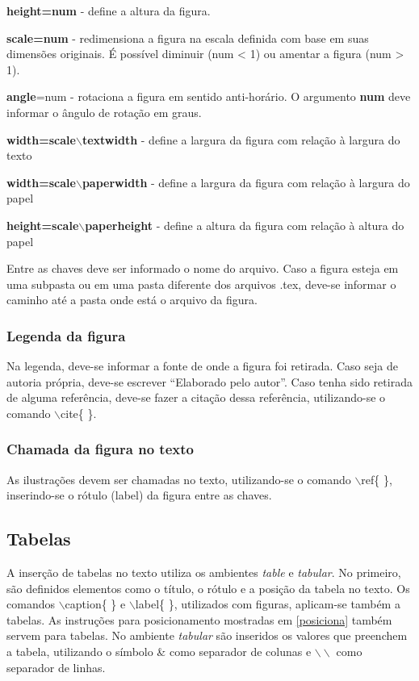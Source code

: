 \textbf{height=num} - define a altura da figura.

\textbf{scale=num} - redimensiona a figura na escala definida com base em suas dimensões originais. É possível diminuir (num < 1) ou amentar a figura (num > 1).

\textbf{angle}=num - rotaciona a figura em sentido anti-horário. O argumento \textbf{num} deve informar o ângulo de rotação em graus.

\textbf{width=scale$\backslash$textwidth} - define a largura da figura com relação à largura do texto

\textbf{width=scale$\backslash$paperwidth} - define a largura da figura com relação à largura do papel

\textbf{height=scale$\backslash$paperheight} - define a altura da figura com relação à altura do papel

Entre as chaves deve ser informado o nome do arquivo. Caso a figura esteja em uma subpasta ou em uma pasta diferente dos arquivos .tex, deve-se informar o caminho até a pasta onde está o arquivo  da figura.

\subsubsection{Legenda da figura}
Na legenda, deve-se informar a fonte de onde a figura foi retirada. Caso seja de autoria própria, deve-se escrever ``Elaborado pelo autor''. Caso tenha sido retirada de alguma referência, deve-se fazer a citação dessa referência, utilizando-se o comando $\backslash$cite\{ \}.


\subsubsection{Chamada da figura no texto}
As ilustrações devem ser chamadas no texto, utilizando-se o comando $\backslash$ref\{ \}, inserindo-se o rótulo (label) da figura entre as chaves.

\subsection{Tabelas}
A inserção de tabelas no texto utiliza os ambientes \textit{table} e \textit{tabular}. No primeiro, são definidos elementos como o título, o rótulo e a posição da tabela no texto. Os comandos $\backslash$caption\{ \} e $\backslash$label\{ \}, utilizados com figuras, aplicam-se também a tabelas. As instruções para posicionamento mostradas em \ref{posiciona} também servem para tabelas. No ambiente \textit{tabular} são inseridos os valores que preenchem a tabela, utilizando o símbolo \& como separador de colunas e $\backslash\backslash$ como separador de linhas.

